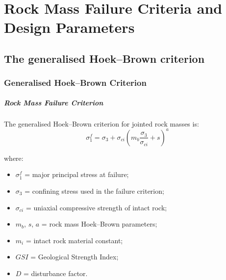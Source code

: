 \chapter{Rock Mass Failure Criteria and Design Parameters}
\label{ch:rock-mass-parameters}

\section{The generalised Hoek--Brown criterion}
\label{sec:the-generalised-hoek-brown-criterion}

\subsection{Generalised Hoek--Brown Criterion}

\paragraph{Rock Mass Failure Criterion}

The generalised Hoek--Brown criterion for jointed rock masses is:
\[
\sigma_1^f =
\sigma_3 +
\sigma_{ci}
\left(
m_b\frac{\sigma_3}{\sigma_{ci}} + s
\right)^a
\]

where:
\begin{itemize}
 \item \(\sigma_1^f\) = major principal stress at failure;
 \item \(\sigma_3\) = confining stress used in the failure criterion;
 \item \(\sigma_{ci}\) = uniaxial compressive strength of intact rock;
 \item \(m_b\), \(s\), \(a\) = rock mass Hoek--Brown parameters;
 \item \(m_i\) = intact rock material constant;
 \item \(GSI\) = Geological Strength Index;
 \item \(D\) = disturbance factor.
\end{itemize}

